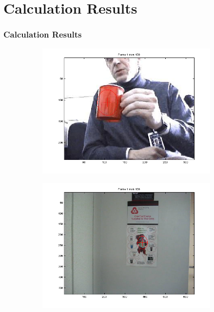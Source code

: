 \documentclass[hyperref={pdfpagelabels=false}]{beamer}
\begin{document}
\section{Calculation Results}
\begin{frame}
\frametitle{Calculation Results}
\centering


\begin{figure}
         \centering
         \begin{subfigure}[b]{0.4\textwidth}
                 \includegraphics[width=\textwidth]{results/redcup/Frame0001.png}
         \end{subfigure}%
         \begin{subfigure}[b]{0.4\textwidth}
                 \includegraphics[width=\textwidth]{results/owl/Frame0001.png}

\end{subfigure}
\end{figure}
\end{frame}
\end{document}
